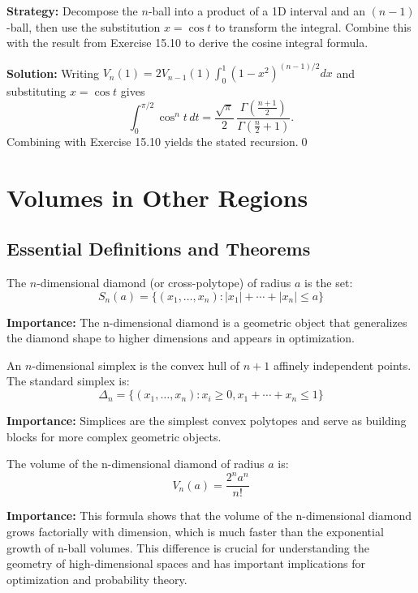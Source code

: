 \noindent\textbf{Strategy:} Decompose the \(n\)-ball into a product of a 1D interval and an \((n-1)\)-ball, then use the substitution \(x = \cos t\) to transform the integral. Combine this with the result from Exercise 15.10 to derive the cosine integral formula.

\bigskip\noindent\textbf{Solution:}
Writing \(V_n(1)=2V_{n-1}(1)\int_0^1 (1-x^2)^{(n-1)/2}dx\) and substituting \(x=\cos t\) gives
\[
\int_0^{\pi/2} \cos^n t\,dt = \frac{\sqrt{\pi}}{2}\,\frac{\Gamma(\tfrac{n+1}{2})}{\Gamma(\tfrac{n}{2}+1)}.
\]
Combining with Exercise 15.10 yields the stated recursion.\qed
\section{Volumes in Other Regions}

\subsection*{Essential Definitions and Theorems}

\begin{definition}
The $n$-dimensional diamond (or cross-polytope) of radius $a$ is the set:
\[S_n(a) = \{(x_1, \ldots, x_n) : |x_1| + \cdots + |x_n| \leq a\}\]
\end{definition}

\noindent\textbf{Importance:} The n-dimensional diamond is a geometric object that generalizes the diamond shape to higher dimensions and appears in optimization.

\begin{definition}[Simplex]
An $n$-dimensional simplex is the convex hull of $n+1$ affinely independent points. The standard simplex is:
\[\Delta_n = \{(x_1, \ldots, x_n) : x_i \geq 0, x_1 + \cdots + x_n \leq 1\}\]
\end{definition}

\noindent\textbf{Importance:} Simplices are the simplest convex polytopes and serve as building blocks for more complex geometric objects.

\begin{theorem}
The volume of the n-dimensional diamond of radius $a$ is:
\[V_n(a) = \frac{2^n a^n}{n!}\]
\end{theorem}

\noindent\textbf{Importance:} This formula shows that the volume of the n-dimensional diamond grows factorially with dimension, which is much faster than the exponential growth of n-ball volumes. This difference is crucial for understanding the geometry of high-dimensional spaces and has important implications for optimization and probability theory.



